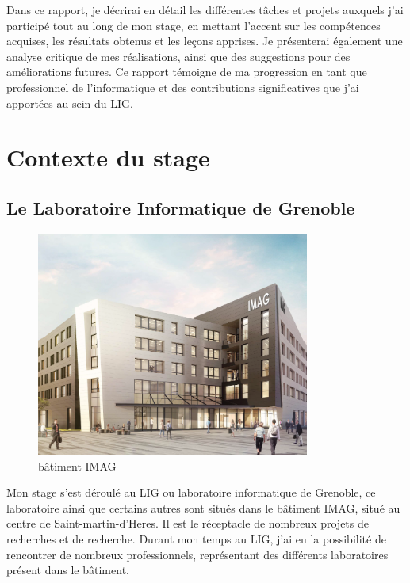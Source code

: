 \documentclass[a4paper,french,12pt, titlepage]{article}
\begin{document}
Dans ce rapport, je décrirai en détail les différentes tâches et projets
auxquels j'ai participé tout au long de mon stage, en mettant l'accent
sur les compétences acquises, les résultats obtenus et les leçons
apprises. Je présenterai également une analyse critique de mes
réalisations, ainsi que des suggestions pour des améliorations futures.
Ce rapport témoigne de ma progression en tant que professionnel de
l'informatique et des contributions significatives que j'ai apportées au
sein du LIG.

\newpage

\hypertarget{contexte-du-stage}{%
\section{Contexte du stage}\label{contexte-du-stage}}

\hypertarget{le-laboratoire-informatique-de-grenoble}{%
\subsection{Le Laboratoire Informatique de
Grenoble}\label{le-laboratoire-informatique-de-grenoble}}

\begin{figure}[h]
\centering
\includegraphics[width=0.8\textwidth,height=0.8\textheight,keepaspectratio]{images/imag.png}
\caption{bâtiment IMAG}
\end{figure}

Mon stage s'est déroulé au LIG ou laboratoire informatique de Grenoble,
ce laboratoire ainsi que certains autres sont situés dans le bâtiment
IMAG, situé au centre de Saint-martin-d'Heres. Il est le réceptacle de
nombreux projets de recherches et de recherche. Durant mon temps au LIG,
j'ai eu la possibilité de rencontrer de nombreux professionnels,
représentant des différents laboratoires présent dans le
bâtiment.\newline
\end{document}
